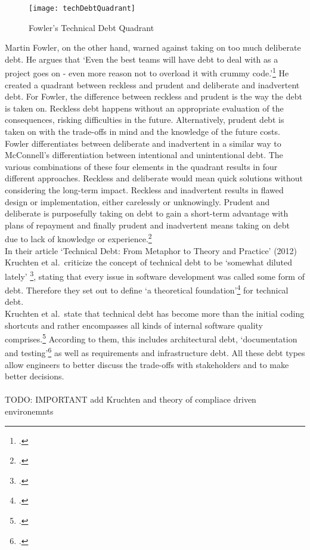 \begin{figure}[H]
    \centering
    \caption[]{Fowler's Technical Debt Quadrant}
    \label{fig:technicaldebtquadrant}
    \texttt{[image: techDebtQuadrant]}
\end{figure}
Martin Fowler, on the other hand, warned against taking on too much deliberate debt. He argues that `Even the best teams will have debt to deal with as a project goes on - even more reason not to overload it with crummy code.'\footcite{fowlerTechnicalDebtQuadrant2009}
He created a quadrant between reckless and prudent and deliberate and inadvertent debt. For Fowler, the difference between reckless and prudent is the way the debt is taken on. Reckless debt happens without an appropriate evaluation of the consequences, risking difficulties in the future. Alternatively, prudent debt is taken on
with the trade-offs in mind and the knowledge of the future costs. Fowler differentiates between deliberate and inadvertent in a similar way to McConnell's differentiation between intentional and unintentional debt.
The various combinations of these four elements in the quadrant results in four different approaches. Reckless and deliberate would mean quick solutions without considering the long-term impact. Reckless and inadvertent results in flawed design or implementation, either carelessly or unknowingly. 
Prudent and deliberate is purposefully taking on debt to gain a short-term advantage with plans of repayment and finally prudent and inadvertent means taking on debt due to lack of knowledge or experience.\footcite{fowlerTechnicalDebtQuadrant2009}\\

In their article `Technical Debt: From Metaphor to Theory and Practice' (2012) Kruchten et al.\ criticize the concept of technical debt to be `somewhat diluted lately' \footcite[18]{kruchtenTechnicalDebtMetaphor2012}, stating that every issue in software development was called some form of debt. 
Therefore they set out to define `a theoretical foundation'\footcite[19]{kruchtenTechnicalDebtMetaphor2012} for technical debt.\\
Kruchten et al.\ state that technical debt has become more than the initial coding shortcuts and rather encompasses all kinds of internal software quality comprises.\footcite[19]{kruchtenTechnicalDebtMetaphor2012}
According to them, this includes architectural debt, `documentation and testing'\footcite[20]{kruchtenTechnicalDebtMetaphor2012} as well as requirements and infrastructure debt.
All these debt types allow engineers to better discuss the trade-offs with stakeholders and to make better decisions.\\
\\TODO: IMPORTANT add Kruchten and theory of compliace driven environemnts

